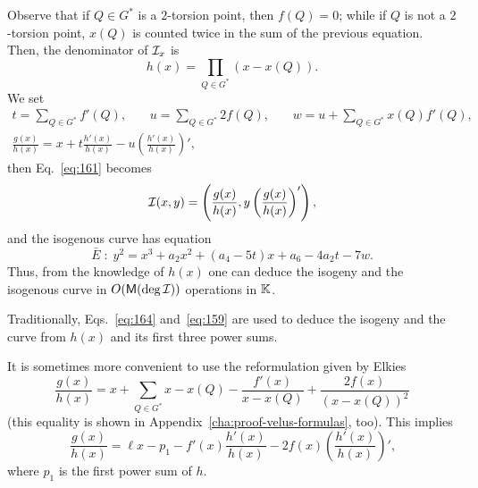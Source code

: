 Observe that if $Q\in G^\ast$ is a $2$-torsion point, then $f(Q)=0$;
while if $Q$ is not a $2$-torsion point, $x(Q)$ is counted twice in
the sum of the previous equation. Then, the denominator of $\mathcal{I}_x$ is
  \begin{equation}
    \label{eq:158}
    h(x) = \prod_{Q\in G^\ast}(x - x(Q))
    \text{.}
  \end{equation}
We set
\begin{equation}
  \label{eq:164}
  \begin{gathered}
    t = \sum_{Q\in G^\ast} f'(Q)\text{,}
    \qquad
    u = \sum_{Q\in G^\ast} 2f(Q)\text{,}
    \qquad
    w = u + \sum_{Q\in G^\ast} x(Q)f'(Q)\text{,}\\
    \frac{g(x)}{h(x)} = x + t\frac{h'(x)}{h(x)} - u\left(\frac{h'(x)}{h(x)}\right)'
    \text{,}
  \end{gathered}
\end{equation}
then Eq.~\eqref{eq:161} becomes
\begin{equation}
  \label{eq:159}
  \mathcal{I}(x,y) = \left(\frac{g(x)}{h(x)}, y\left(\frac{g(x)}{h(x)}\right)'\right)
  \text{,}
\end{equation}
and the isogenous curve has equation
\begin{equation}
  \label{eq:163}
  \bar{E}\;:\;y^2 = x^3 + a_2x^2 + (a_4-5t)x + a_6 - 4a_2t - 7w
  \text{.}
\end{equation}
Thus, from the knowledge of $h(x)$ one can deduce the isogeny and the
isogenous curve in $O(\mathsf{M}(\deg\mathcal{I}))$ operations in $\mathbb{K}$.

\begin{remark}
  Traditionally, Eqs.~\eqref{eq:164} and~\eqref{eq:159} are used to
  deduce the isogeny and the curve from $h(x)$ and its first three
  power sums.

    It is sometimes more
  convenient to use the reformulation given by Elkies~\cite{elkies98}
  \begin{equation}
    \label{eq:157}
    \frac{g(x)}{h(x)} = x + \sum_{Q\in G^\ast}x - x(Q) - \frac{f'(x)}{x-x(Q)} + \frac{2f(x)}{(x-x(Q))^2}
  \end{equation}
  (this equality is shown in Appendix~\ref{cha:proof-velus-formulas},
  too). This implies
  \begin{equation}
    \label{eq:165}
    \frac{g(x)}{h(x)} = \ell x - p_1 - f'(x)\frac{h'(x)}{h(x)} -
    2f(x)\left(\frac{h'(x)}{h(x)}\right)'
    \text{,}
  \end{equation}
  where $p_1$ is the first power sum of $h$.
\end{remark}

